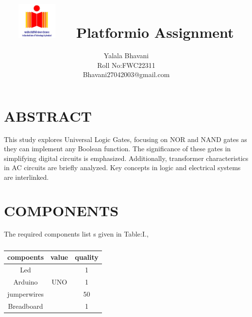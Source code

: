 \documentclass[conference]{IEEEtran}                   \IEEEoverridecommandlockouts
\title{                                               
\vspace{1cm}                                             {\includegraphics[width=0.15\textwidth]{1.jpg} \    \ Platformio Assignment} }
\author{Yalala Bhavani \\ Roll No:FWC22311\\Bhavani27042003@gmail.com}
\begin{document}
                                        \maketitle                                                \section {ABSTRACT}
This study explores Universal Logic Gates, focusing on NOR and NAND gates as they can implement any Boolean function. The significance of these gates in simplifying digital circuits is emphasized. Additionally, transformer characteristics in AC circuits are briefly analyzed. Key concepts in logic and electrical systems are interlinked.

\section{COMPONENTS}
The required components list s given in Table:I.,
\vspace{0.3cm}
\begin{table} [htbp]
\centering
\begin{tabular}{| c| c | c |} \hline
compoents & value & quality \\\hline
Led & & 1 \\ \hline
Arduino & UNO & 1\\ \hline
jumperwires & & 50 \\ \hline
Breadboard & & 1 \\
\hline
\end{tabular}
\vspace{0.3cm}
\caption{\label{tab:widgets}}
\end{table}
\end{document}

